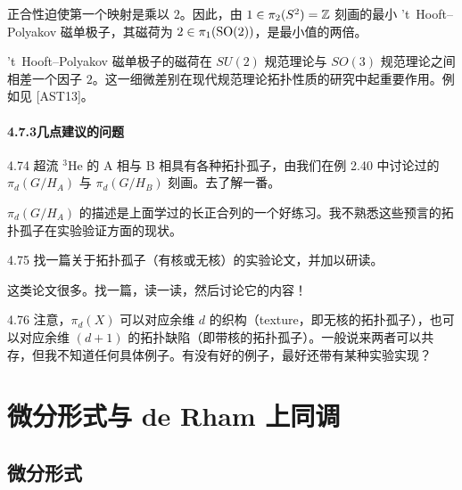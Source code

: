
正合性迫使第一个映射是乘以 $2$。因此，由 $1\in\pi_2(S^2)=\mathbb{Z}$ 刻画的最小 \textquoteright t~Hooft--Polyakov 磁单极子，其磁荷为 $2\in\pi_1(\mathrm{SO}(2))$，是最小值的两倍。

\textquoteright t~Hooft--Polyakov 磁单极子的磁荷在 $SU(2)$ 规范理论与 $SO(3)$ 规范理论之间相差一个因子 $2$。这一细微差别在现代规范理论拓扑性质的研究中起重要作用。例如见 [AST13]。

\subsubsection*{4.7.3\quad 几点建议的问题}

\begin{question}{4.74}
  超流 $^3$He 的 A 相与 B 相具有各种拓扑孤子，由我们在例 2.40 中讨论过的 $\pi_d(G/H_A)$ 与 $\pi_d(G/H_B)$ 刻画。去了解一番。
\end{question}

$\pi_d(G/H_A)$ 的描述是上面学过的长正合列的一个好练习。我不熟悉这些预言的拓扑孤子在实验验证方面的现状。

\begin{question}{4.75}
  找一篇关于拓扑孤子（有核或无核）的实验论文，并加以研读。
\end{question}

这类论文很多。找一篇，读一读，然后讨论它的内容！

\begin{question}{4.76}
  注意，$\pi_d(X)$ 可以对应余维 $d$ 的织构（texture，即无核的拓扑孤子），也可以对应余维 $(d+1)$ 的拓扑缺陷（即带核的拓扑孤子）。一般说来两者可以共存，但我不知道任何具体例子。有没有好的例子，最好还带有某种实验实现？
\end{question}

\chapter{微分形式与 de Rham 上同调}

\section{微分形式}

